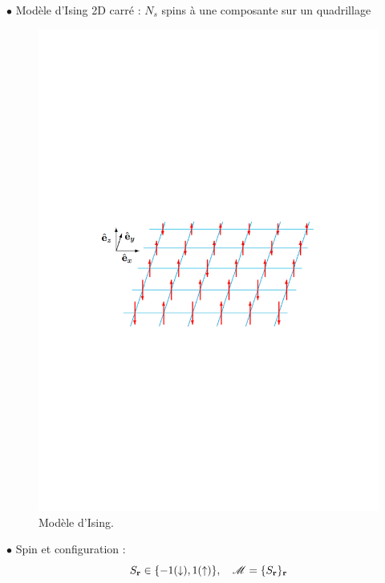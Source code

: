 \documentclass[9pt]{beamer}
\begin{document}
\setlength{\columnseprule}{0.4pt}
\begin{frame}
		\justifying
		\vspace*{22pt}


\begin{multicols}{2}

		$\bullet$ Modèle d'Ising 2D carré :
			$N_s$ spins à une composante sur un quadrillage
			\vspace*{-11pt}
			
\begin{figure}[H]
\begin{center}
\includegraphics[scale =0.35]{Ising2D.pdf}
\caption{Modèle d'Ising.}
	\label{fig:schemaIsing}
	\end{center}
\end{figure}

$\bullet$ Spin et configuration :
\begin{equation*}
 S_{\bf r} \in \{-1(\downarrow),1(\uparrow)\}, \quad \mathscr{M} = \{S_{\bf r}\}_{\bf r}
\end{equation*}



\end{multicols}
\end{frame}
\end{document}
